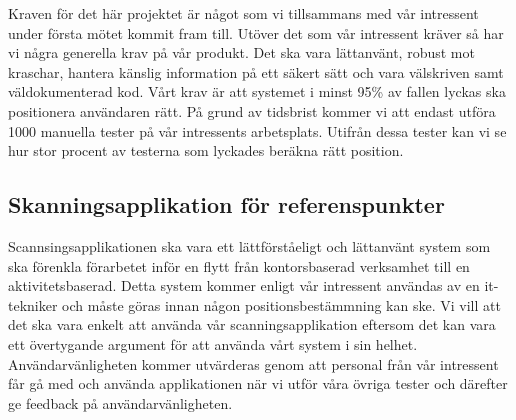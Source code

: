 \documentclass[swedish, a4paper,12pt]{article}
\begin{document}
%
%
%
%
%
Kraven för det här projektet är något som vi tillsammans med vår intressent under första mötet kommit fram till. Utöver det som vår intressent kräver så har vi några generella krav på vår produkt. Det ska vara lättanvänt, robust mot kraschar, hantera känslig information på ett säkert sätt och vara välskriven samt väldokumenterad kod. Vårt krav är att systemet i minst 95\% av fallen lyckas ska positionera användaren rätt. På grund av tidsbrist kommer vi att endast utföra 1000 manuella tester på vår intressents arbetsplats. Utifrån dessa tester kan vi se hur stor procent av testerna som lyckades beräkna rätt position. %

\subsection{Skanningsapplikation för referenspunkter}
Scannsingsapplikationen ska vara ett lättförståeligt och lättanvänt system som ska förenkla förarbetet inför en flytt från kontorsbaserad verksamhet till en aktivitetsbaserad. Detta system kommer enligt vår intressent användas av en it-tekniker och måste göras innan någon positionsbestämmning kan ske. Vi vill att det ska vara enkelt att använda vår scanningsapplikation eftersom det kan vara ett övertygande argument för att använda vårt system i sin helhet. Användarvänligheten kommer utvärderas genom att personal från vår intressent får gå med och använda applikationen när vi utför våra övriga tester och därefter ge feedback på användarvänligheten.
\end{document}
